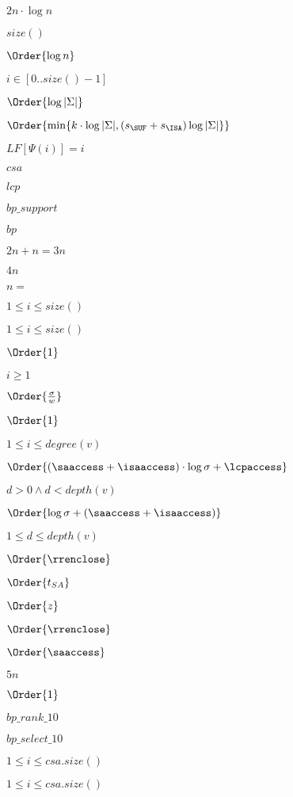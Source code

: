 \documentclass{article}
\begin{document}
$ 2n\cdot \log n$
\pagebreak

$size()$
\pagebreak

$ \Order{\log n} $
\pagebreak

$i\in [0..size()-1]$
\pagebreak

$ \Order{\log |\Sigma|} $
\pagebreak

$ \Order{\min\{k\cdot \log |\Sigma|, (s_{\SUF}+s_{\ISA})\log|\Sigma|\}} $
\pagebreak

$LF[\Psi(i)]=i$
\pagebreak

$csa$
\pagebreak

$lcp$
\pagebreak

$bp\_support$
\pagebreak

$bp$
\pagebreak

$2n+n=3n$
\pagebreak

$4n$
\pagebreak

$n=$
\pagebreak

$1\leq i\leq size()$
\pagebreak

$ 1 \leq i \leq size() $
\pagebreak

$ \Order{1}$
\pagebreak

$i \geq 1$
\pagebreak

$ \Order{\frac{\sigma}{w}} $
\pagebreak

$\Order{1}$
\pagebreak

$ 1 \leq i \leq degree(v) $
\pagebreak

$ \Order{(\saaccess+\isaaccess) \cdot \log\sigma + \lcpaccess} $
\pagebreak

$ d > 0 \wedge d < depth(v) $
\pagebreak

$ \Order{ \log\sigma + (\saaccess+\isaaccess) } $
\pagebreak

$ 1 \leq d \leq depth(v) $
\pagebreak

$ \Order{\rrenclose}\ $
\pagebreak

$\Order{t_{SA}}$
\pagebreak

$ \Order{z} $
\pagebreak

$ \Order{ \rrenclose } $
\pagebreak

$ \Order{ \saaccess } $
\pagebreak

$5n$
\pagebreak

$\Order{1} $
\pagebreak

$bp\_rank\_10$
\pagebreak

$bp\_select\_10$
\pagebreak

$1\leq i\leq csa.size()$
\pagebreak

$ 1 \leq i \leq csa.size() $
\pagebreak
\end{document}
